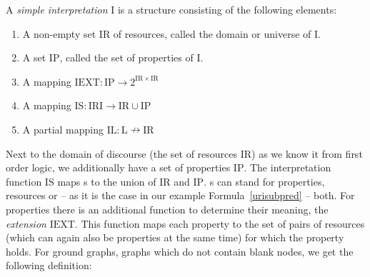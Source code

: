 \begin{definition}\label{si}
A \emph{simple interpretation} $\mathrm{I}$ is a structure consisting of the following elements:
\begin{enumerate}
 \item A non-empty set $\mathrm{IR}$ of resources, called the domain or universe of $\mathrm{I}$.
 \item A set $\mathrm{IP}$, called the set of properties of $\mathrm{I}$.
 \item A mapping $\mathrm{IEXT}: \mathrm{IP} \rightarrow 2^{\mathrm{IR}\times \mathrm{IR}}$
 \item A mapping $\mathrm{IS}:\mathrm{IRI}\rightarrow \mathrm{IR}\cup \mathrm{IP}$
 \item A partial mapping $\mathrm{IL}:\mathrm{L} \nrightarrow \mathrm{IR}$
\end{enumerate}
\end{definition}
Next to the domain of discourse (the set of resources $\mathrm{IR}$) as we know it from first order logic,  we additionally have 
a set of properties $\mathrm{IP}$.
The interpretation function $\mathrm{IS}$ maps \iri{}s to the union of $\mathrm{IR}$ and $\mathrm{IP}$. 
\iri{}s can stand for properties, resources or -- as it is the case in our example Formula~\ref{urisubpred} -- both. 
For properties there is an additional function to determine their meaning, the \emph{extension} $\mathrm{IEXT}$. 
This function  maps  each property to the set of pairs of resources (which can again also be properties at the same time) for which the property holds.
% 
% 
For ground graphs, \ie graphs which do not contain blank nodes, we get the following definition:
